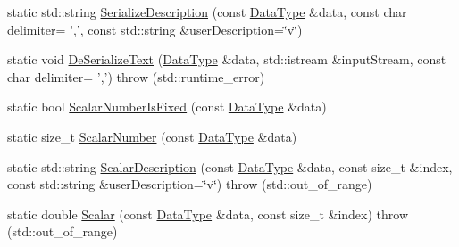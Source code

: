 \begin{DoxyCompactItemize}
static std\-::string \hyperlink{classcmn_data_3_01vct_fixed_size_vector_3_01__element_type_00_01__size_01_4_01_4_a9e72004f82707865c912ff74d5be411d}{Serialize\-Description} (const \hyperlink{classcmn_data_3_01vct_fixed_size_vector_3_01__element_type_00_01__size_01_4_01_4_ac8ff1c45828cc2add8111e02980f183a}{Data\-Type} \&data, const char delimiter= ',', const std\-::string \&user\-Description=\char`\"{}v\char`\"{})
\item 
static void \hyperlink{classcmn_data_3_01vct_fixed_size_vector_3_01__element_type_00_01__size_01_4_01_4_ac4807c248bde06dc6dbe1793173025ce}{De\-Serialize\-Text} (\hyperlink{classcmn_data_3_01vct_fixed_size_vector_3_01__element_type_00_01__size_01_4_01_4_ac8ff1c45828cc2add8111e02980f183a}{Data\-Type} \&data, std\-::istream \&input\-Stream, const char delimiter= ',')  throw (std\-::runtime\-\_\-error)
\item 
static bool \hyperlink{classcmn_data_3_01vct_fixed_size_vector_3_01__element_type_00_01__size_01_4_01_4_a69f5801a80d617a9c97756429f4f008f}{Scalar\-Number\-Is\-Fixed} (const \hyperlink{classcmn_data_3_01vct_fixed_size_vector_3_01__element_type_00_01__size_01_4_01_4_ac8ff1c45828cc2add8111e02980f183a}{Data\-Type} \&data)
\item 
static size\-\_\-t \hyperlink{classcmn_data_3_01vct_fixed_size_vector_3_01__element_type_00_01__size_01_4_01_4_a4c99540fb651cdc206d3da2126acb85d}{Scalar\-Number} (const \hyperlink{classcmn_data_3_01vct_fixed_size_vector_3_01__element_type_00_01__size_01_4_01_4_ac8ff1c45828cc2add8111e02980f183a}{Data\-Type} \&data)
\item 
static std\-::string \hyperlink{classcmn_data_3_01vct_fixed_size_vector_3_01__element_type_00_01__size_01_4_01_4_a91520a61c8ffa02442586316577b988e}{Scalar\-Description} (const \hyperlink{classcmn_data_3_01vct_fixed_size_vector_3_01__element_type_00_01__size_01_4_01_4_ac8ff1c45828cc2add8111e02980f183a}{Data\-Type} \&data, const size\-\_\-t \&index, const std\-::string \&user\-Description=\char`\"{}v\char`\"{})  throw (std\-::out\-\_\-of\-\_\-range)
\item 
static double \hyperlink{classcmn_data_3_01vct_fixed_size_vector_3_01__element_type_00_01__size_01_4_01_4_a6c826af2ae1de2df965896d7b173d04a}{Scalar} (const \hyperlink{classcmn_data_3_01vct_fixed_size_vector_3_01__element_type_00_01__size_01_4_01_4_ac8ff1c45828cc2add8111e02980f183a}{Data\-Type} \&data, const size\-\_\-t \&index)  throw (std\-::out\-\_\-of\-\_\-range)
\end{DoxyCompactItemize}


